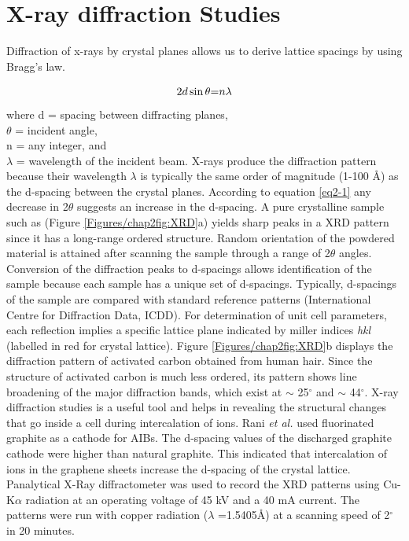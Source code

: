 \section{X-ray diffraction Studies}
Diffraction of x-rays by crystal planes allows us to derive lattice spacings by using Bragg's law. 

 \begin{equation} \label{eq2-1}
     2d\sin\theta \text= n{\lambda}
 \end{equation}
 where d = spacing between diffracting planes,\\
$\theta$ = incident angle,\\ 
n = any integer, and \\
$\lambda$ = wavelength of the incident beam. X-rays produce the diffraction pattern because their wavelength $\lambda$ is typically the same order of magnitude (1-100 \AA) as the d-spacing between the crystal planes. According to equation \ref{eq2-1} any decrease in 2$\theta$ suggests an increase in the d-spacing. 
A pure crystalline sample such as  (Figure \ref{Figures/chap2fig:XRD}a) yields sharp peaks in a XRD pattern since it has a long-range ordered structure. Random orientation of the powdered material is attained after scanning the sample through a range of 2$\theta$ angles. Conversion of the diffraction peaks to d-spacings allows identification of the sample because each sample has a unique set of d-spacings. Typically, d-spacings of the sample are compared with standard reference patterns (International Centre for Diffraction Data, ICDD). For determination of unit cell parameters, each reflection implies a specific lattice plane indicated by miller indices \textit{hkl} (labelled in red  for  crystal lattice). Figure \ref{Figures/chap2fig:XRD}b displays the diffraction pattern of activated carbon obtained from human hair. Since the structure of activated carbon is much less ordered, its pattern shows line broadening of the major diffraction bands, which exist at $\sim$ 25$^{\circ}$  and $\sim$ 44$^{\circ}$.
X-ray diffraction studies is a useful tool and helps in revealing the structural changes that go inside a cell during intercalation of ions. Rani \textit{et al.} used fluorinated graphite as a cathode for AIBs. The d-spacing values of the discharged graphite cathode were higher than natural graphite. This indicated that intercalation of  ions in the graphene sheets increase the d-spacing of the crystal lattice\cite{rani_fluorinated_2013-1}.
Panalytical X-Ray diffractometer was used to record the XRD patterns using Cu-K$\alpha$ radiation at an operating voltage of 45 kV and a 40 mA current. The patterns were run with copper radiation ($\lambda$ =1.5405\AA) at a scanning speed of 2$^{\circ}$ in 20 minutes. 

